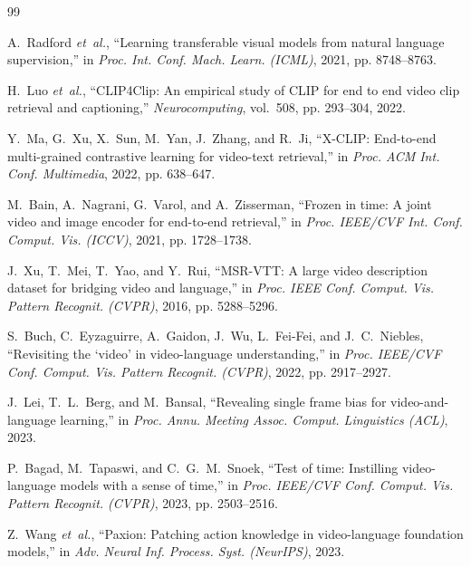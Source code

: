 \documentclass[lettersize,journal]{IEEEtran}
\begin{document}
\begin{thebibliography}{99}

A.~Radford \textit{et~al.}, ``Learning transferable visual models from natural
language supervision,'' in \textit{Proc. Int. Conf. Mach. Learn. (ICML)},
2021, pp. 8748--8763.

H.~Luo \textit{et~al.}, ``CLIP4Clip: An empirical study of CLIP for end to
end video clip retrieval and captioning,'' \textit{Neurocomputing}, vol.~508,
pp. 293--304, 2022.

Y.~Ma, G.~Xu, X.~Sun, M.~Yan, J.~Zhang, and R.~Ji, ``X-CLIP: End-to-end
multi-grained contrastive learning for video-text retrieval,'' in
\textit{Proc. ACM Int. Conf. Multimedia}, 2022, pp. 638--647.

M.~Bain, A.~Nagrani, G.~Varol, and A.~Zisserman, ``Frozen in time: A joint
video and image encoder for end-to-end retrieval,'' in \textit{Proc. IEEE/CVF
Int. Conf. Comput. Vis. (ICCV)}, 2021, pp. 1728--1738.

J.~Xu, T.~Mei, T.~Yao, and Y.~Rui, ``MSR-VTT: A large video description
dataset for bridging video and language,'' in \textit{Proc. IEEE Conf. Comput.
Vis. Pattern Recognit. (CVPR)}, 2016, pp. 5288--5296.

S.~Buch, C.~Eyzaguirre, A.~Gaidon, J.~Wu, L.~Fei-Fei, and J.~C.~Niebles,
``Revisiting the `video' in video-language understanding,'' in \textit{Proc.
IEEE/CVF Conf. Comput. Vis. Pattern Recognit. (CVPR)}, 2022, pp. 2917--2927.

J.~Lei, T.~L.~Berg, and M.~Bansal, ``Revealing single frame bias for
video-and-language learning,'' in \textit{Proc. Annu. Meeting Assoc. Comput.
Linguistics (ACL)}, 2023.

P.~Bagad, M.~Tapaswi, and C.~G.~M.~Snoek, ``Test of time: Instilling
video-language models with a sense of time,'' in \textit{Proc. IEEE/CVF Conf.
Comput. Vis. Pattern Recognit. (CVPR)}, 2023, pp. 2503--2516.

Z.~Wang \textit{et~al.}, ``Paxion: Patching action knowledge in
video-language foundation models,'' in \textit{Adv. Neural Inf. Process.
Syst. (NeurIPS)}, 2023.


\end{thebibliography}
\end{document}
